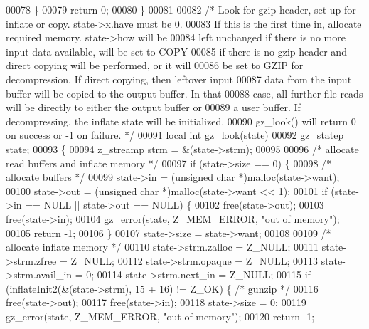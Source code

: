 \begin{DoxyCode}
00078     \}
00079     \textcolor{keywordflow}{return} 0;
00080 \}
00081 
00082 \textcolor{comment}{/* Look for gzip header, set up for inflate or copy.  state->x.have must be 0.}
00083 \textcolor{comment}{   If this is the first time in, allocate required memory.  state->how will be}
00084 \textcolor{comment}{   left unchanged if there is no more input data available, will be set to COPY}
00085 \textcolor{comment}{   if there is no gzip header and direct copying will be performed, or it will}
00086 \textcolor{comment}{   be set to GZIP for decompression.  If direct copying, then leftover input}
00087 \textcolor{comment}{   data from the input buffer will be copied to the output buffer.  In that}
00088 \textcolor{comment}{   case, all further file reads will be directly to either the output buffer or}
00089 \textcolor{comment}{   a user buffer.  If decompressing, the inflate state will be initialized.}
00090 \textcolor{comment}{   gz\_look() will return 0 on success or -1 on failure. */}
00091 local \textcolor{keywordtype}{int} gz\_look(state)
00092     gz\_statep state;
00093 \{
00094     z\_streamp strm = &(state->strm);
00095 
00096     \textcolor{comment}{/* allocate read buffers and inflate memory */}
00097     \textcolor{keywordflow}{if} (state->size == 0) \{
00098         \textcolor{comment}{/* allocate buffers */}
00099         state->in = (\textcolor{keywordtype}{unsigned} \textcolor{keywordtype}{char} *)malloc(state->want);
00100         state->out = (\textcolor{keywordtype}{unsigned} \textcolor{keywordtype}{char} *)malloc(state->want << 1);
00101         \textcolor{keywordflow}{if} (state->in == NULL || state->out == NULL) \{
00102             free(state->out);
00103             free(state->in);
00104             gz\_error(state, Z\_MEM\_ERROR, \textcolor{stringliteral}{"out of memory"});
00105             \textcolor{keywordflow}{return} -1;
00106         \}
00107         state->size = state->want;
00108 
00109         \textcolor{comment}{/* allocate inflate memory */}
00110         state->strm.zalloc = Z\_NULL;
00111         state->strm.zfree = Z\_NULL;
00112         state->strm.opaque = Z\_NULL;
00113         state->strm.avail\_in = 0;
00114         state->strm.next\_in = Z\_NULL;
00115         \textcolor{keywordflow}{if} (inflateInit2(&(state->strm), 15 + 16) != Z\_OK) \{    \textcolor{comment}{/* gunzip */}
00116             free(state->out);
00117             free(state->in);
00118             state->size = 0;
00119             gz\_error(state, Z\_MEM\_ERROR, \textcolor{stringliteral}{"out of memory"});
00120             \textcolor{keywordflow}{return} -1;

\end{DoxyCode}
